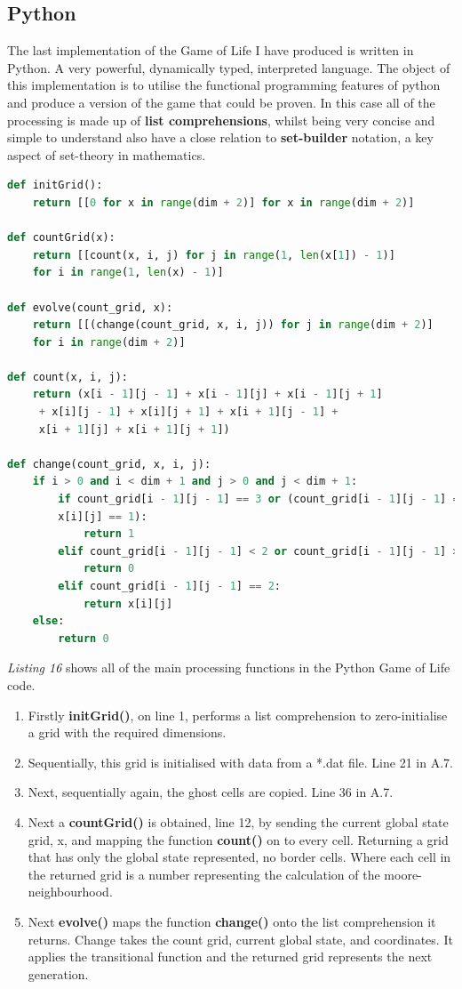 \documentclass[11pt]{article} %
\begin{document}
\subsection{Python}
The last implementation of the Game of Life I have produced is written in Python. A very powerful, dynamically typed, interpreted language. The object of this implementation is to utilise the functional programming features of python and produce a version of the game that could be proven. In this case all of the processing is made up of {\bf list comprehensions}, whilst being very concise and simple to understand also have a close relation to {\bf set-builder} notation, a key aspect of set-theory  in mathematics.
\begin{lstlisting}[language=Python,caption={A Python Game of Life using List Comprehensions}]
def initGrid():
    return [[0 for x in range(dim + 2)] for x in range(dim + 2)]
    
def countGrid(x):
    return [[count(x, i, j) for j in range(1, len(x[1]) - 1)]
    for i in range(1, len(x) - 1)]    

def evolve(count_grid, x):
    return [[(change(count_grid, x, i, j)) for j in range(dim + 2)]
    for i in range(dim + 2)]

def count(x, i, j):
    return (x[i - 1][j - 1] + x[i - 1][j] + x[i - 1][j + 1]
     + x[i][j - 1] + x[i][j + 1] + x[i + 1][j - 1] +
     x[i + 1][j] + x[i + 1][j + 1])
     
def change(count_grid, x, i, j):
    if i > 0 and i < dim + 1 and j > 0 and j < dim + 1:
        if count_grid[i - 1][j - 1] == 3 or (count_grid[i - 1][j - 1] == 2 and
        x[i][j] == 1):
            return 1
        elif count_grid[i - 1][j - 1] < 2 or count_grid[i - 1][j - 1] > 3:
            return 0
        elif count_grid[i - 1][j - 1] == 2:
            return x[i][j]
    else:
        return 0     
\end{lstlisting}
{\it Listing 16} shows all of the main processing functions in the Python Game of Life code. 
\begin{enumerate}
\item Firstly {\bf initGrid()}, on line 1,  performs a list comprehension to zero-initialise a grid with the required dimensions.
\item Sequentially, this grid is initialised with data from a *.dat file. Line 21 in A.7.
\item Next, sequentially again, the ghost cells are copied. Line 36 in A.7.
\item Next a {\bf countGrid()} is obtained, line 12, by sending the current global state grid, x, and mapping the function {\bf count()} on to every cell. Returning a grid that has only the global state represented, no border cells. Where each cell in the returned grid is a number representing the calculation of the moore-neighbourhood.
\item Next {\bf evolve()} maps the function {\bf change()} onto the list comprehension it returns. Change takes the count grid, current global state, and coordinates. It applies the transitional function and the returned grid represents the next generation.
\end{enumerate}
\end{document}
